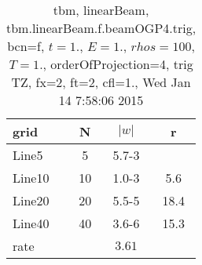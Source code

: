 \begin{table}[hbt]\tableFont %
\begin{center}
\begin{tabular}{|l|c|c|c|} \hline 
grid  & N &  $\vert w \vert$   & r \\ \hline 
               Line5 &     5 & \num{5.7}{-3} &       \\ \hline
              Line10 &    10 & \num{1.0}{-3} &  5.6  \\ \hline
              Line20 &    20 & \num{5.5}{-5} & 18.4  \\ \hline
              Line40 &    40 & \num{3.6}{-6} & 15.3  \\ \hline
    rate             &       &  $3.61$       &       \\ \hline
\end{tabular}
\caption{tbm, linearBeam, tbm.linearBeam.f.beamOGP4.trig, bcn=f, $ t=1.$, $ E=1.$, $ rhos=100$, $ T=1.$,  orderOfProjection=4, trig TZ, fx=2, ft=2, cfl=1., Wed Jan 14  7:58:06 2015}\label{table:tbm.linearBeam.f.beamOGP4.trig}
\end{center}
\end{table}

